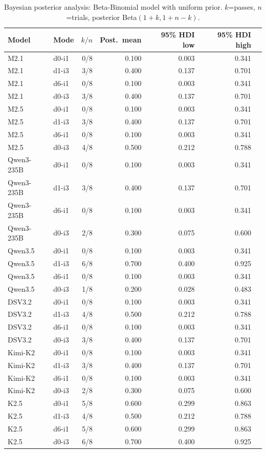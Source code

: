 \begin{table}[t]
\centering
\caption{Bayesian posterior analysis: Beta-Binomial model with uniform prior. $k$=passes, $n$=trials, posterior Beta$(1{+}k, 1{+}n{-}k)$.}
\label{tab:bayesian-posteriors}
\begin{tabular}{llrrrrr}
\toprule
Model & Mode & $k/n$ & Post.\ mean & 95\% HDI low & 95\% HDI high \\
\midrule
  M2.1 & d0-i1 & 0/8 & 0.100 & 0.003 & 0.341 \\
  M2.1 & d1-i3 & 3/8 & 0.400 & 0.137 & 0.701 \\
  M2.1 & d6-i1 & 0/8 & 0.100 & 0.003 & 0.341 \\
  M2.1 & d0-i3 & 3/8 & 0.400 & 0.137 & 0.701 \\
  M2.5 & d0-i1 & 0/8 & 0.100 & 0.003 & 0.341 \\
  M2.5 & d1-i3 & 3/8 & 0.400 & 0.137 & 0.701 \\
  M2.5 & d6-i1 & 0/8 & 0.100 & 0.003 & 0.341 \\
  M2.5 & d0-i3 & 4/8 & 0.500 & 0.212 & 0.788 \\
  Qwen3-235B & d0-i1 & 0/8 & 0.100 & 0.003 & 0.341 \\
  Qwen3-235B & d1-i3 & 3/8 & 0.400 & 0.137 & 0.701 \\
  Qwen3-235B & d6-i1 & 0/8 & 0.100 & 0.003 & 0.341 \\
  Qwen3-235B & d0-i3 & 2/8 & 0.300 & 0.075 & 0.600 \\
  Qwen3.5 & d0-i1 & 0/8 & 0.100 & 0.003 & 0.341 \\
  Qwen3.5 & d1-i3 & 6/8 & 0.700 & 0.400 & 0.925 \\
  Qwen3.5 & d6-i1 & 0/8 & 0.100 & 0.003 & 0.341 \\
  Qwen3.5 & d0-i3 & 1/8 & 0.200 & 0.028 & 0.483 \\
  DSV3.2 & d0-i1 & 0/8 & 0.100 & 0.003 & 0.341 \\
  DSV3.2 & d1-i3 & 4/8 & 0.500 & 0.212 & 0.788 \\
  DSV3.2 & d6-i1 & 0/8 & 0.100 & 0.003 & 0.341 \\
  DSV3.2 & d0-i3 & 3/8 & 0.400 & 0.137 & 0.701 \\
  Kimi-K2 & d0-i1 & 0/8 & 0.100 & 0.003 & 0.341 \\
  Kimi-K2 & d1-i3 & 3/8 & 0.400 & 0.137 & 0.701 \\
  Kimi-K2 & d6-i1 & 0/8 & 0.100 & 0.003 & 0.341 \\
  Kimi-K2 & d0-i3 & 2/8 & 0.300 & 0.075 & 0.600 \\
  K2.5 & d0-i1 & 5/8 & 0.600 & 0.299 & 0.863 \\
  K2.5 & d1-i3 & 4/8 & 0.500 & 0.212 & 0.788 \\
  K2.5 & d6-i1 & 5/8 & 0.600 & 0.299 & 0.863 \\
  K2.5 & d0-i3 & 6/8 & 0.700 & 0.400 & 0.925 \\
\bottomrule
\end{tabular}
\end{table}


